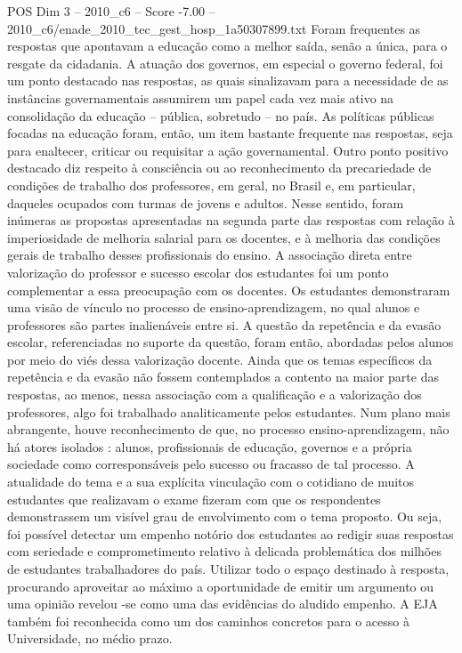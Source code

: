 \begin{textsample}{POS Dim 3 – 2010\_c6 – Score -7.00 – 2010\_c6/enade\_2010\_tec\_gest\_hosp\_1a50307899.txt}
Foram frequentes as respostas que apontavam a educação como a melhor saída, senão a única, para o resgate da cidadania.
A atuação dos governos, em especial o governo federal, foi um ponto destacado nas respostas, as quais sinalizavam para a necessidade de as instâncias governamentais assumirem um papel cada vez mais ativo na consolidação da educação – pública, sobretudo – no país.
As políticas públicas focadas na educação foram, então, um item bastante frequente nas respostas, seja para enaltecer, criticar ou requisitar a ação governamental.
Outro ponto positivo destacado diz respeito à consciência ou ao reconhecimento da precariedade de condições de trabalho dos professores, em geral, no Brasil e, em particular, daqueles ocupados com turmas de jovens e adultos.
Nesse sentido, foram inúmeras as propostas apresentadas na segunda parte das respostas com relação à imperiosidade de melhoria salarial para os docentes, e à melhoria das condições gerais de trabalho desses profissionais do ensino.
A associação direta entre valorização do professor e sucesso escolar dos estudantes foi um ponto complementar a essa preocupação com os docentes.
Os estudantes demonstraram uma visão de vínculo no processo de ensino-aprendizagem, no qual alunos e professores são partes inalienáveis entre si.
A questão da repetência e da evasão escolar, referenciadas no suporte da questão, foram então, abordadas pelos alunos por meio do viés dessa valorização docente.
Ainda que os temas específicos da repetência e da evasão não fossem contemplados a contento na maior parte das respostas, ao menos, nessa associação com a qualificação e a valorização dos professores, algo foi trabalhado analiticamente pelos estudantes.
Num plano mais abrangente, houve reconhecimento de que, no processo ensino-aprendizagem, não há atores isolados : alunos, profissionais de educação, governos e a própria sociedade como corresponsáveis pelo sucesso ou fracasso de tal processo.
A atualidade do tema e a sua explícita vinculação com o cotidiano de muitos estudantes que realizavam o exame fizeram com que os respondentes demonstrassem um visível grau de envolvimento com o tema proposto.
Ou seja, foi possível detectar um empenho notório dos estudantes ao redigir suas respostas com seriedade e comprometimento relativo à delicada problemática dos milhões de estudantes trabalhadores do país.
Utilizar todo o espaço destinado à resposta, procurando aproveitar ao máximo a oportunidade de emitir um argumento ou uma opinião revelou -se como uma das evidências do aludido empenho.
A EJA também foi reconhecida como um dos caminhos concretos para o acesso à Universidade, no médio prazo.

\end{textsample}

